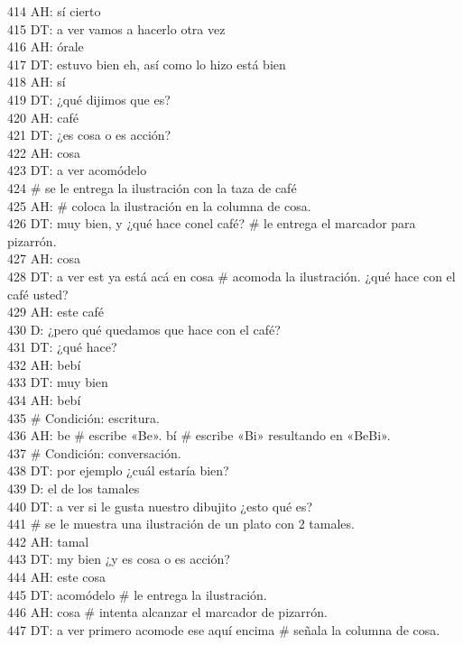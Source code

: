 414 AH: sí cierto\\
415 DT: a ver vamos a hacerlo otra vez\\
416 AH: órale\\
417 DT: estuvo bien eh, así como lo hizo está bien\\
418 AH: sí\\
419 DT: ¿qué dijimos que es?\\
420 AH: café\\
421 DT: ¿es cosa o es acción?\\
422 AH: cosa\\
423 DT: a ver acomódelo\\
424 \# se le entrega la ilustración con la taza de café\\
425 AH: \# coloca la ilustración en la columna de cosa.\\
426 DT: muy bien, y ¿qué hace conel café? \# le entrega el marcador para pizarrón.\\
427 AH: cosa\\
428 DT: a ver est ya está acá en cosa \# acomoda la ilustración. ¿qué hace con el café usted?\\
429 AH: este café\\
430 D: ¿pero qué quedamos que hace con el café?\\
431 DT: ¿qué hace?\\
432 AH: bebí\\
433 DT: muy bien\\
434 AH: bebí\\
435 \# Condición: escritura.\\
436 AH: be \# escribe «Be». bí # escribe «Bi» resultando en «BeBi».\\
437 # Condición: conversación.\\
438 DT: por ejemplo ¿cuál estaría bien?\\
439 D: el de los tamales\\
440 DT: a ver si le gusta nuestro dibujito ¿esto qué es?\\
441 \# se le muestra una ilustración de un plato con 2 tamales.\\
442 AH: tamal\\
443 DT: my bien ¿y es cosa o es acción?\\
444 AH: este cosa\\
445 DT: acomódelo \# le entrega la ilustración.\\
446 AH: cosa # intenta alcanzar el marcador de pizarrón.\\
447 DT: a ver primero acomode ese aquí encima \# señala la columna de cosa.\\
